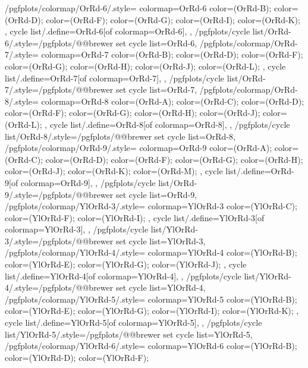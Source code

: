 {  %
  /pgfplots/colormap/OrRd-6/.style={
    colormap={OrRd-6}{
      color=(OrRd-B);
      color=(OrRd-D);
      color=(OrRd-F);
      color=(OrRd-G);
      color=(OrRd-I);
      color=(OrRd-K);
    },
    cycle list/.define={OrRd-6}{[of colormap=OrRd-6]},
  },
  /pgfplots/cycle list/OrRd-6/.style={/pgfplots/@@brewer set cycle list={OrRd-6}},
  /pgfplots/colormap/OrRd-7/.style={
    colormap={OrRd-7}{
      color=(OrRd-B);
      color=(OrRd-D);
      color=(OrRd-F);
      color=(OrRd-G);
      color=(OrRd-H);
      color=(OrRd-J);
      color=(OrRd-L);
    },
    cycle list/.define={OrRd-7}{[of colormap=OrRd-7]},
  },
  /pgfplots/cycle list/OrRd-7/.style={/pgfplots/@@brewer set cycle list={OrRd-7}},
  /pgfplots/colormap/OrRd-8/.style={
    colormap={OrRd-8}{
      color=(OrRd-A);
      color=(OrRd-C);
      color=(OrRd-D);
      color=(OrRd-F);
      color=(OrRd-G);
      color=(OrRd-H);
      color=(OrRd-J);
      color=(OrRd-L);
    },
    cycle list/.define={OrRd-8}{[of colormap=OrRd-8]},
  },
  /pgfplots/cycle list/OrRd-8/.style={/pgfplots/@@brewer set cycle list={OrRd-8}},
  /pgfplots/colormap/OrRd-9/.style={
    colormap={OrRd-9}{
      color=(OrRd-A);
      color=(OrRd-C);
      color=(OrRd-D);
      color=(OrRd-F);
      color=(OrRd-G);
      color=(OrRd-H);
      color=(OrRd-J);
      color=(OrRd-K);
      color=(OrRd-M);
    },
    cycle list/.define={OrRd-9}{[of colormap=OrRd-9]},
  },
  /pgfplots/cycle list/OrRd-9/.style={/pgfplots/@@brewer set cycle list={OrRd-9}},
  /pgfplots/colormap/YlOrRd-3/.style={
    colormap={YlOrRd-3}{
      color=(YlOrRd-C);
      color=(YlOrRd-F);
      color=(YlOrRd-I);
    },
    cycle list/.define={YlOrRd-3}{[of colormap=YlOrRd-3]},
  },
  /pgfplots/cycle list/YlOrRd-3/.style={/pgfplots/@@brewer set cycle list={YlOrRd-3}},
  /pgfplots/colormap/YlOrRd-4/.style={
    colormap={YlOrRd-4}{
      color=(YlOrRd-B);
      color=(YlOrRd-E);
      color=(YlOrRd-G);
      color=(YlOrRd-J);
    },
    cycle list/.define={YlOrRd-4}{[of colormap=YlOrRd-4]},
  },
  /pgfplots/cycle list/YlOrRd-4/.style={/pgfplots/@@brewer set cycle list={YlOrRd-4}},
  /pgfplots/colormap/YlOrRd-5/.style={
    colormap={YlOrRd-5}{
      color=(YlOrRd-B);
      color=(YlOrRd-E);
      color=(YlOrRd-G);
      color=(YlOrRd-I);
      color=(YlOrRd-K);
    },
    cycle list/.define={YlOrRd-5}{[of colormap=YlOrRd-5]},
  },
  /pgfplots/cycle list/YlOrRd-5/.style={/pgfplots/@@brewer set cycle list={YlOrRd-5}},
  /pgfplots/colormap/YlOrRd-6/.style={
    colormap={YlOrRd-6}{
      color=(YlOrRd-B);
      color=(YlOrRd-D);
      color=(YlOrRd-F);
}}}
